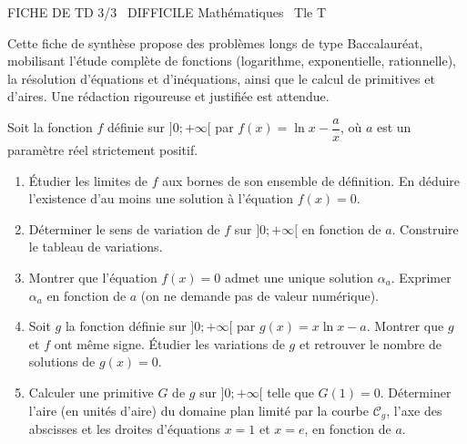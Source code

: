 \documentclass[11pt]{article}
\begin{document}
\begin{tcolorbox}[enhanced,colback=popink,colframe=popink,arc=10pt,boxrule=0pt,left=12pt,right=12pt,top=9pt,bottom=9pt]
{\color{white}\popxbold\small FICHE DE TD 3/3 \textbullet\ DIFFICILE \hfill Mathématiques \textbullet\ Tle T\par}
\end{tcolorbox}
\vspace{4pt}
\noindent Cette fiche de synthèse propose des problèmes longs de type Baccalauréat, mobilisant l'étude complète de fonctions (logarithme, exponentielle, rationnelle), la résolution d'équations et d'inéquations, ainsi que le calcul de primitives et d'aires. Une rédaction rigoureuse et justifiée est attendue.

\begin{exercice}
Soit la fonction $f$ définie sur $]0; +\infty[$ par $f(x) = \ln x - \dfrac{a}{x}$, où $a$ est un paramètre réel strictement positif.
\begin{enumerate}
    \item Étudier les limites de $f$ aux bornes de son ensemble de définition. En déduire l'existence d'au moins une solution à l'équation $f(x)=0$.
    \item Déterminer le sens de variation de $f$ sur $]0; +\infty[$ en fonction de $a$. Construire le tableau de variations.
    \item Montrer que l'équation $f(x)=0$ admet une unique solution $\alpha_a$. Exprimer $\alpha_a$ en fonction de $a$ (on ne demande pas de valeur numérique).
    \item Soit $g$ la fonction définie sur $]0; +\infty[$ par $g(x) = x \ln x - a$. Montrer que $g$ et $f$ ont même signe. Étudier les variations de $g$ et retrouver le nombre de solutions de $g(x)=0$.
    \item Calculer une primitive $G$ de $g$ sur $]0; +\infty[$ telle que $G(1)=0$. Déterminer l'aire (en unités d'aire) du domaine plan limité par la courbe $\mathcal{C}_g$, l'axe des abscisses et les droites d'équations $x=1$ et $x=e$, en fonction de $a$.
\end{enumerate}
\end{exercice}
\end{document}
